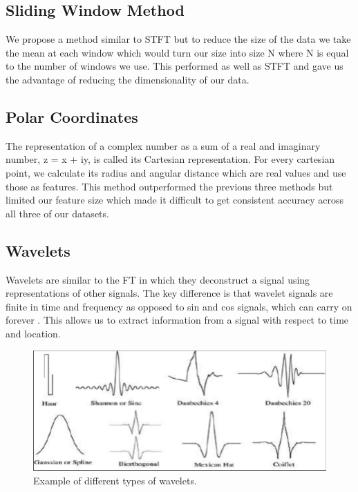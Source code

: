 \documentclass{turabian-thesis}
\begin{document}




\subsection{Sliding Window Method}

We propose a method similar to STFT but to reduce the size of the data we take the mean at each window which would turn our size into size N where N is equal to the number of windows we use. This performed as well as STFT and gave us the advantage of reducing the dimensionality of our data. 

\subsection{Polar Coordinates}

The representation of a complex number as a sum of a real and imaginary number, z = x + iy, is called its Cartesian representation. For every cartesian point, we calculate its radius and angular distance which are real values and use those as features. This method outperformed the previous three methods but limited our feature size which made it difficult to get consistent accuracy across all three of our datasets.

\subsection{Wavelets}

Wavelets are similar to the FT in which they deconstruct a signal using representations of other signals. The key difference is that wavelet signals are finite in time and frequency as opposed to sin and cos signals, which can carry on forever \cite{strang_wavelets_1996}. This allows us to extract information from a signal with respect to time and location.


\begin{figure}[h!]
   \begin{center}
      \includegraphics[scale=0.4]{../media/wavelet_families.png}
   \end{center}
   \caption{Example of different types of wavelets.}
   \label{fig:reinforcementAgent}
\end{figure}
\end{document}
